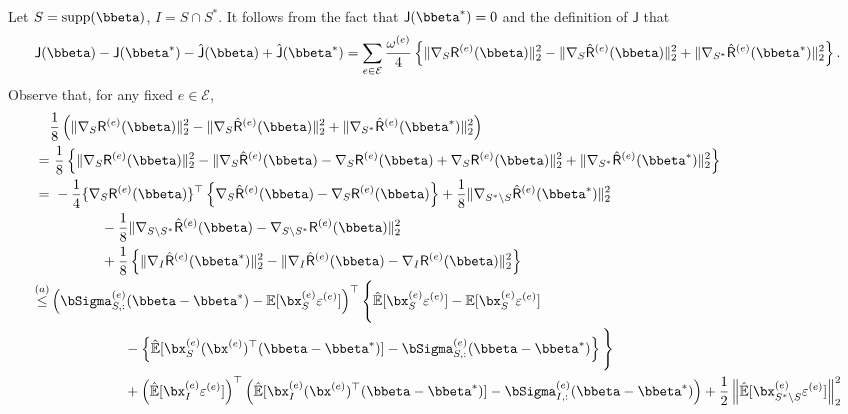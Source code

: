 \documentclass[10pt]{article}
\numberwithin{equation}{section}
\newcommand*{\supp}{\mathrm{supp}}
\begin{document}
Let $S=\supp(\bbeta)$, $I = S\cap S^*$. It follows from the fact that $\mathsf{J}(\bbeta^*)=0$ and the definition of $\mathsf{J}$ that
\begin{align*}
	\mathsf{J}(\bbeta) - \mathsf{J}(\bbeta^*) - \hat{\mathsf{J}}(\bbeta) + \hat{\mathsf{J}}(\bbeta^*) = \sum_{e\in \mathcal{E}} \frac{\omega^{(e)}}{4} \left\{\|\nabla_S \mathsf{R}^{(e)}(\bbeta)\|^2_2 - \|\nabla_S \hat{\mathsf{R}}^{(e)}(\bbeta)\|_2^2 + \|\nabla_{S^*} \hat{\mathsf{R}}^{(e)}(\bbeta^*)\|_2^2\right\}.
\end{align*}
Observe that, for any fixed $e\in \mathcal{E}$, 
\begin{align}
&\frac{1}{8}\left(\|\nabla_S \mathsf{R}^{(e)}(\bbeta)\|^2_2 - \|\nabla_S \hat{\mathsf{R}}^{(e)}(\bbeta)\|_2^2 + \|\nabla_{S^*} \hat{\mathsf{R}}^{(e)}(\bbeta^*)\|_2^2\right) \nonumber \\
=&~ \frac{1}{8}\left\{\|\nabla_S \mathsf{R}^{(e)}(\bbeta)\|^2_2 - \|\nabla_S \hat{\mathsf{R}}^{(e)}(\bbeta) - \nabla_S \mathsf{R}^{(e)}(\bbeta) + \nabla_S \mathsf{R}^{(e)}(\bbeta)\|_2^2 + \|\nabla_{S^*} \hat{\mathsf{R}}^{(e)}(\bbeta^*)\|_2^2\right\} \nonumber\\
=&~ -\frac{1}{4} \{\nabla_S \mathsf{R}^{(e)}(\bbeta)\}^\top \left\{\nabla_S \hat{\mathsf{R}}^{(e)}(\bbeta) - \nabla_S {\mathsf{R}}^{(e)}(\bbeta)\right\} + \frac{1}{8} \|\nabla_{S^*\setminus S} \hat{\mathsf{R}}^{(e)}(\bbeta^*)\|_2^2 \nonumber\\
&~~~~~~~~~~~ - \frac{1}{8} \|\nabla_{S\setminus S^*} \hat{\mathsf{R}}^{(e)}(\bbeta) - \nabla_{S\setminus S^*} {\mathsf{R}}^{(e)}(\bbeta)\|_2^2 \nonumber\\
&~~~~~~~~~~~ + \frac{1}{8}\left\{\|\nabla_{I} \hat{\mathsf{R}}^{(e)}(\bbeta^*)\|_2^2 - \|\nabla_{I} \hat{\mathsf{R}}^{(e)}(\bbeta) - \nabla_{I} \mathsf{R}^{(e)}(\bbeta)\|_2^2\right\} \nonumber\\
\overset{(a)}{\le}&  \left(\bSigma^{(e)}_{S,:}(\bbeta - \bbeta^*) - \mathbb{E}[\bx_S^{(e)} \varepsilon^{(e)}]\right)^\top \Bigg\{\hat{\mathbb{E}}[\bx_S^{(e)} \varepsilon^{(e)}] - \mathbb{E}[\bx_S^{(e)} \varepsilon^{(e)}]  \nonumber\\
&~~~~~~~~~~~~~~~~ - \left\{\hat{\mathbb{E}}[\bx_S^{(e)} (\bx^{(e)})^\top (\bbeta - \bbeta^*)] - \bSigma^{(e)}_{S,:} (\bbeta- \bbeta^*)\right\}\Bigg\} \nonumber\\
&~~~~~~~~~~~~~~~~ + \left(\hat{\mathbb{E}}[\bx_{I}^{(e)} \varepsilon^{(e)}] \right)^\top \left(\hat{\mathbb{E}} [\bx_{I}^{(e)} (\bx^{(e)})^\top (\bbeta - \bbeta^*)] - \bSigma^{(e)}_{I,:} (\bbeta - \bbeta^*)\right) + \frac{1}{2} \left\|\hat{\mathbb{E}}[\bx_{S^*\setminus S}^{(e)} \varepsilon^{(e)}]\right\|_2^2 \nonumber\\

\end{align}
\end{document}
